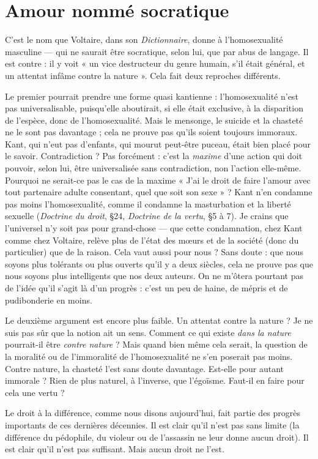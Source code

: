 \section{Amour nommé socratique}
C’est le nom que Voltaire, dans son {\it Dictionnaire},
donne à l'homosexualité masculine —
qui ne saurait être socratique, selon lui, que par abus de langage. Il est
contre : il y voit « un vice destructeur du genre humain, s’il était général, et un
attentat infâme contre la nature ». Cela fait deux reproches différents.

Le premier pourrait prendre une forme quasi kantienne : l'homosexualité
n’est pas universalisable, puisqu'elle aboutirait, si elle était exclusive, à la disparition
de l'espèce, donc de l'homosexualité. Mais le mensonge, le suicide et la
chasteté ne le sont pas davantage ; cela ne prouve pas qu’ils soient toujours
immoraux. Kant, qui n’eut pas d’enfants, qui mourut peut-être puceau, était
bien placé pour le savoir. Contradiction ? Pas forcément : c’est la {\it maxime} d’une
action qui doit pouvoir, selon lui, être universalisée sans contradiction, non
l’action elle-même. Pourquoi ne serait-ce pas le cas de la maxime « J'ai le droit
de faire l'amour avec tout partenaire adulte consentant, quel que soit son
sexe » ? Kant n’en condamne pas moins l'homosexualité, comme il condamne
la masturbation et la liberté sexuelle ({\it Doctrine du droit}, \S 24, {\it Doctrine de la
vertu}, \S  5 à 7). Je crains que l’universel n’y soit pas pour grand-chose — que
cette condamnation, chez Kant comme chez Voltaire, relève plus de l’état des
mœurs et de la société (donc du particulier) que de la raison. Cela vaut aussi
pour nous ? Sans doute : que nous soyons plus tolérants ou plus ouverts qu’il y
a deux siècles, cela ne prouve pas que nous soyons plus intelligents que nos
deux auteurs. On ne m’ôtera pourtant pas de l’idée qu’il s’agit là d’un progrès :
c’est un peu de haine, de mépris et de pudibonderie en moins.

Le deuxième argument est encore plus faible. Un attentat contre la nature ?
Je ne suis pas sûr que la notion ait un sens. Comment ce qui existe {\it dans la
nature} pourrait-il être {\it contre nature} ? Mais quand bien même cela serait, la
question de la moralité ou de l’immoralité de l’homosexualité ne s’en poserait
pas moins. Contre nature, la chasteté l’est sans doute davantage. Est-elle pour
autant immorale ? Rien de plus naturel, à l'inverse, que l’égoïsme. Faut-il en
faire pour cela une vertu ?

Le droit à la différence, comme nous disons aujourd’hui, fait partie des progrès
importants de ces dernières décennies. Il est clair qu’il n’est pas sans limite
(la différence du pédophile, du violeur ou de l’assassin ne leur donne aucun
droit). Il est clair qu’il n’est pas suffisant. Mais aucun droit ne l’est.

